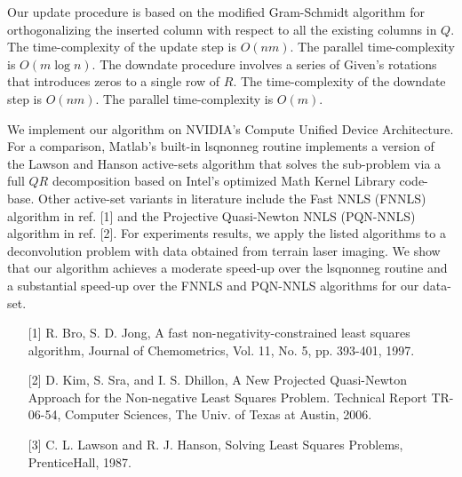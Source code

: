 \documentclass{report}
\begin{document}
Our update procedure is based on the modified Gram-Schmidt algorithm for
orthogonalizing the inserted column with respect to all the existing
columns in $Q$. The time-complexity of the update step is $O(nm)$. The
parallel time-complexity is $O(m\log{n})$. The downdate procedure
involves a series of Given's rotations that introduces zeros to a single
row of $R$. The time-complexity of the downdate step is $O(nm)$. The
parallel time-complexity is $O(m)$.

We implement our algorithm on NVIDIA's Compute Unified Device
Architecture. For a comparison, Matlab's built-in lsqnonneg routine
implements a version of the Lawson and Hanson active-sets algorithm that
solves the sub-problem via a full $QR$ decomposition based on Intel's
optimized Math Kernel Library code-base. Other active-set variants in
literature include the Fast NNLS (FNNLS) algorithm in ref. [1] and the
Projective Quasi-Newton NNLS (PQN-NNLS) algorithm in ref. [2]. For
experiments results, we apply the listed algorithms to a deconvolution
problem with data obtained from terrain laser imaging. We show that our
algorithm achieves a moderate speed-up over the lsqnonneg routine and a
substantial speed-up over the FNNLS and PQN-NNLS algorithms for our
data-set.

\vspace{1cm}

{}
\begin{enumerate}
\item[{[1]}] R. Bro, S. D. Jong, A fast non-negativity-constrained least
squares algorithm, Journal of Chemometrics, Vol. 11, No. 5, pp. 393-401,
1997.

\item[{[2]}] D. Kim, S. Sra, and I. S. Dhillon, A New Projected
Quasi-Newton Approach for the Non-negative Least Squares Problem.
Technical Report TR-06-54, Computer Sciences, The Univ. of Texas at
Austin, 2006.

\item[{[3]}] C. L. Lawson and R. J. Hanson, Solving Least Squares
Problems, PrenticeHall, 1987.
\end{enumerate}
\end{document}
